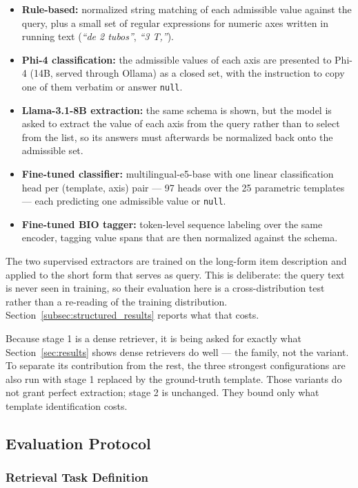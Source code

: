 \documentclass[preprint,review,12pt]{elsarticle}
\begin{document}
\begin{itemize}
    \item \textbf{Rule-based:} normalized string matching of each admissible value against the query, plus a small set of regular expressions for numeric axes written in running text (\textit{``de 2 tubos''}, \textit{``3 T,''}).
    \item \textbf{Phi-4 classification:} the admissible values of each axis are presented to Phi-4 (14B, served through Ollama) as a closed set, with the instruction to copy one of them verbatim or answer \texttt{null}.
    \item \textbf{Llama-3.1-8B extraction:} the same schema is shown, but the model is asked to extract the value of each axis from the query rather than to select from the list, so its answers must afterwards be normalized back onto the admissible set.
    \item \textbf{Fine-tuned classifier:} multilingual-e5-base with one linear classification head per (template, axis) pair --- 97 heads over the 25 parametric templates --- each predicting one admissible value or \texttt{null}.
    \item \textbf{Fine-tuned BIO tagger:} token-level sequence labeling over the same encoder, tagging value spans that are then normalized against the schema.
\end{itemize}

The two supervised extractors are trained on the long-form item description and applied to the short form that serves as query. This is deliberate: the query text is never seen in training, so their evaluation here is a cross-distribution test rather than a re-reading of the training distribution. Section~\ref{subsec:structured_results} reports what that costs.

Because stage 1 is a dense retriever, it is being asked for exactly what Section~\ref{sec:results} shows dense retrievers do well --- the family, not the variant. To separate its contribution from the rest, the three strongest configurations are also run with stage 1 replaced by the ground-truth template. Those variants do not grant perfect extraction; stage 2 is unchanged. They bound only what template identification costs.

\subsection{Evaluation Protocol}

\subsubsection{Retrieval Task Definition}
\end{document}
